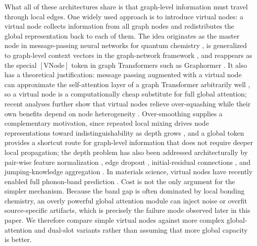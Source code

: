 \documentclass[a4paper,11pt]{article}
\begin{document}
What all of these architectures share is that graph-level information must travel through local edges. One widely used approach is to introduce virtual nodes: a virtual node collects information from all graph nodes and redistributes the global representation back to each of them. The idea originates as the master node in message-passing neural networks for quantum chemistry \cite{gilmer2017neural}, is generalized to graph-level context vectors in the graph-network framework \cite{battaglia2018relational}, and reappears as the special \([\mathrm{VNode}]\) token in graph Transformers such as Graphormer \cite{ying2021transformers}. It also has a theoretical justification: message passing augmented with a virtual node can approximate the self-attention layer of a graph Transformer arbitrarily well \cite{cai2023connection}, so a virtual node is a computationally cheap substitute for full global attention; recent analyses further show that virtual nodes relieve over-squashing while their own benefits depend on node heterogeneity \cite{southern2024understanding}. Over-smoothing supplies a complementary motivation, since repeated local mixing drives node representations toward indistinguishability as depth grows \cite{li2018deeper,oono2020graph}, and a global token provides a shortcut route for graph-level information that does not require deeper local propagation; the depth problem has also been addressed architecturally by pair-wise feature normalization \cite{zhao2020pairnorm}, edge dropout \cite{rong2020dropedge}, initial-residual connections \cite{chen2020gcnii}, and jumping-knowledge aggregation \cite{xu2018jknet}. In materials science, virtual nodes have recently enabled full phonon-band prediction \cite{okabe2024virtual}. Cost is not the only argument for the simpler mechanism. Because the band gap is often dominated by local bonding chemistry, an overly powerful global attention module can inject noise or overfit source-specific artifacts, which is precisely the failure mode observed later in this paper. We therefore compare simple virtual nodes against more complex global-attention and dual-slot variants rather than assuming that more global capacity is better.
\end{document}
